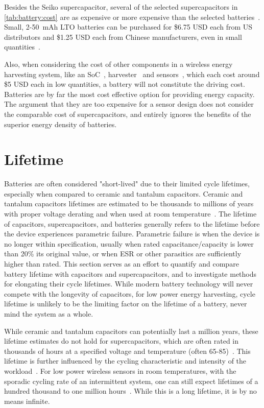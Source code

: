 Besides the Seiko supercapacitor, several of the selected supercapacitors in \cref{tab:battery:cost} are as expensive or more expensive than the selected batteries~\cite{murataCap,kemetCap,seikoCap,bestCap}.
Small, 2-50~mAh LTO batteries can be purchased for
\$6.75 USD each from US distributors and \$1.25 USD each from Chinese manufacturers, even in small quantities~\cite{LTODatasheet, LTODatasheet2}. 

Also, when considering the cost of other components in a wireless energy harvesting system, like
an SoC~\cite{nrf52840}, harvester~\cite{sanyoSolarCell} and sensors~\cite{si7021},
which each cost around \$5 USD each in low quantities, a battery will not constitute
the driving cost. Batteries are by far the most cost effective option for providing energy capacity. The argument that they are too expensive for a sensor design does not consider the comparable cost of supercapacitors, and entirely ignores the benefits of the superior energy density of batteries. 


\section{Lifetime}
\label{sec:battery:life}
Batteries are often considered "short-lived" due to their limited cycle lifetimes, especially when compared to ceramic and tantalum capacitors. 
Ceramic and tantalum capacitors lifetimes are estimated to be thousands to millions of years with proper voltage derating and when used at room temperature~\cite{kemetLife}. 
The lifetime of capacitors, supercapacitors, and batteries generally refers to the lifetime before the device experiences parametric failure. Parametric failure is when the device is no longer within specification, usually when rated capacitance/capacity is lower than 20\% its original value, or when ESR or other parasitics are sufficiently higher than rated.
This section serves as an effort to quantify and compare battery lifetime with capacitors and supercapacitors, and to investigate methods for elongating their cycle lifetimes.
While modern battery technology will never compete with the longevity of capacitors, for low power energy harvesting, cycle lifetime is unlikely to be the limiting factor on the lifetime of a battery, never mind the system as a whole. 

While ceramic and tantalum capacitors can potentially last a million years, these lifetime estimates do not hold for supercapacitors, which are often rated in thousands of hours at a specified voltage and temperature (often 65-85\ssi{\celsius})~\cite{bestCap,murataCap}. This lifetime is further influenced by the cycling characteristic and intensity of the workload~\cite{kreczanik2013study}. For low power wireless sensors in room temperatures, with the sporadic cycling rate of an intermittent system, one can still expect lifetimes of a hundred thousand to one million hours~\cite{kreczanik2013study}. While this is a long lifetime, it is by no means infinite.

